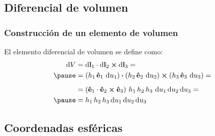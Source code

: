 \documentclass[12pt]{beamer}
\begin{document}
\subsection{Diferencial de volumen}

\begin{frame}
\frametitle{Construcción de un elemento de volumen}
El elemento diferencial de volumen se define como:
\pause
\begin{eqnarray*}
\begin{aligned}
\dd{V} &= \dd{\vb{l}_{1}} \cdot \dd{\vb{l}_{2}} \cp \dd{\vb{l}_{3}} = \\ \pause
&= \left( h_{1} \, \vu{e}_{1} \, \dd{u}_{1} \right) \vdot \left( h_{2} \, \vu{e}_{2} \, \dd{u}_{2} \right) \cp \left( h_{3} \, \vu{e}_{3} \, \dd{u}_{3} \right) =  \\[0.5em]
&= \left( \vu{e}_{1} \cdot \vu{e}_{2} \cp \vu{e}_{3} \right) \, h_{1} \, h_{2} \, h_{3} \, \dd{u_{1}} \dd{u_{2}} \dd{u_{3}} = \\ \pause
&= h_{1} \, h_{2} \, h_{3} \dd{u_{1}} \dd{u_{2}} \dd{u_{3}}
\end{aligned}
\end{eqnarray*}
\end{frame}

\subsection*{Coordenadas esféricas}
\end{document}
